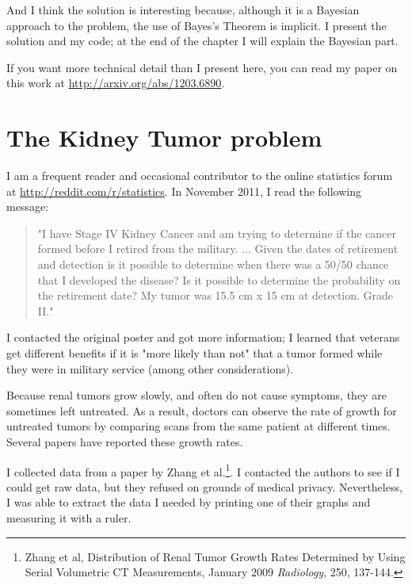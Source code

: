 \documentclass[12pt]{book}
\begin{document}
And I think the solution is interesting because, although it
is a Bayesian approach to the problem, the use of Bayes's Theorem
is implicit.  I present the solution and my code; at the end
of the chapter I will explain the Bayesian part.

If you want more technical detail than I present here, you can
read my paper on this work at \url{http://arxiv.org/abs/1203.6890}.


\section{The Kidney Tumor problem}

I am a frequent reader and occasional contributor to the online statistics
forum at \url{http://reddit.com/r/statistics}.  In November 2011, I read
the following message:

\begin{quote}
"I have Stage IV Kidney Cancer and am trying to determine if the
  cancer formed before I retired from the military. ... Given the
  dates of retirement and detection is it possible to determine when
  there was a 50/50 chance that I developed the disease? Is it
  possible to determine the probability on the retirement date?  My
  tumor was 15.5 cm x 15 cm at detection. Grade II."
\end{quote}

I contacted the original poster and got more information; I learned
that veterans get different benefits if it is "more likely than not"
that a tumor formed while they were in military service (among other
considerations).

Because renal tumors grow slowly, and often do not cause symptoms,
they are sometimes left untreated.  As a result, doctors can observe
the rate of growth for untreated tumors by comparing scans from the
same patient at different times.  Several papers have reported these
growth rates.

I collected data from a paper by Zhang et al.\footnote{Zhang et al,
  Distribution of Renal Tumor Growth Rates Determined by Using Serial
  Volumetric CT Measurements, January 2009 {\it Radiology}, 250,
  137-144.}.  I contacted the authors to see if I could get raw data,
but they refused on grounds of medical privacy.  Nevertheless, I was
able to extract the data I needed by printing one of their graphs and
measuring it with a ruler.
\end{document}
